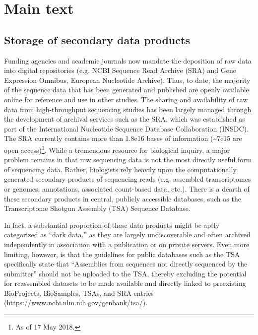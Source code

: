 \documentclass[a4paper,num-refs]{oup-contemporary}
\begin{document}
\section{Main text}
\subsection{Storage of secondary data products}
Funding agencies and academic journals now mandate the deposition of raw data into digital repositories (e.g. NCBI Sequence Read Archive (SRA) and Gene Expression Omnibus, European Nucleotide Archive). Thus, to date, the majority of the sequence data that has been generated and published are openly available online for reference and use in other studies. The sharing and availability of raw data from high-throughput sequencing studies has been largely managed through the development of archival services such as the SRA, which was established as part of the International Nucleotide Sequence Database Collaboration (INSDC)\cite{Kodama2012, Shumway2009}. The SRA currently contains more than 1.8e16 bases of information (\textasciitilde7e15 are open access)\footnote{As of 17 May 2018.}. While a tremendous resource for biological inquiry, a major problem remains in that raw sequencing data is not the most directly useful form of sequencing data. Rather, biologists rely heavily upon the computationally generated secondary products of sequencing reads (e.g. assembled transcriptomes or genomes, annotations, associated count-based data, etc.). There is a dearth of these secondary products in central, publicly accessible databases, such as the  Transcriptome Shotgun Assembly (TSA) Sequence Database.

In fact, a substantial proportion of these data products might be aptly categorized as ``dark data,'' as they are largely undiscoverable and often archived independently in association with a publication or on private servers. Even more limiting, however, is that the guidelines for public databases such as the TSA specifically state that ``Assemblies from sequences not directly sequenced by the submitter'' should not be uploaded to the TSA, thereby excluding the potential for reassembled datasets to be made available and directly linked to preexisting BioProjects, BioSamples, TSAs, and SRA entries (https://www.ncbi.nlm.nih.gov/genbank/tsa/).
\end{document}
